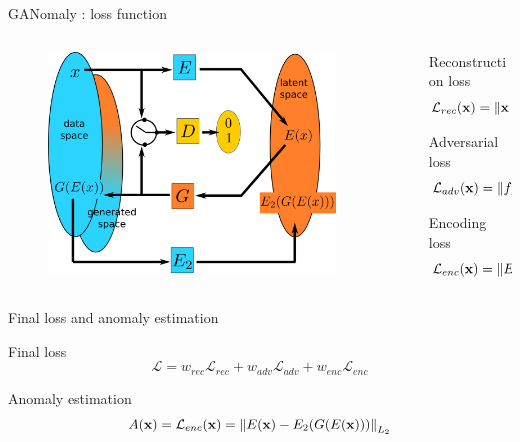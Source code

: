\documentclass[xcolor=pdftex,dvipsnames,table,mathserif,aspectratio=169]{beamer}
\begin{document}
\begin{frame}{GANomaly : loss function}

\begin{columns}
  \begin{column}{.5\textwidth}
  \begin{figure}[ht]
    \centering
    \includegraphics[width=0.9\textwidth]{ganomaly}
  \end{figure}

  \end{column}

  \begin{column}{.5\textwidth}
\small

  \begin{block}{Reconstruction loss}
    \[ \mathcal{L}_{rec}(\mathbf{x}) = \norm{\mathbf{x} - G(E(\mathbf{x}))}_{L_1} \]
  \end{block}

  \begin{block}{Adversarial loss}
    \[ \mathcal{L}_{adv}(\mathbf{x}) = \norm{f_D(\mathbf{x}) - f_D(G(E(\mathbf{x})))}_{L_2} \]
  \end{block}

  \begin{block}{Encoding loss}
    \[ \mathcal{L}_{enc}(\mathbf{x}) = \norm{E(\mathbf{x}) - E_2(G(E(\mathbf{x})))}_{L_2} \]
  \end{block}

  \end{column}
\end{columns}



\end{frame}


\begin{frame}{Final loss and anomaly estimation}

  \begin{block}{Final loss}
  \[\mathcal{L} = w_{rec}\mathcal{L}_{rec} + w_{adv}\mathcal{L}_{adv} + w_{enc}\mathcal{L}_{enc}\]
  \end{block}

  \begin{block}{Anomaly estimation}
    \[A(\mathbf{x}) = \mathcal{L}_{enc}(\mathbf{x}) = \norm{E(\mathbf{x}) - E_2(G(E(\mathbf{x})))}_{L_2} \]
  \end{block}
\end{frame}
\end{document}
